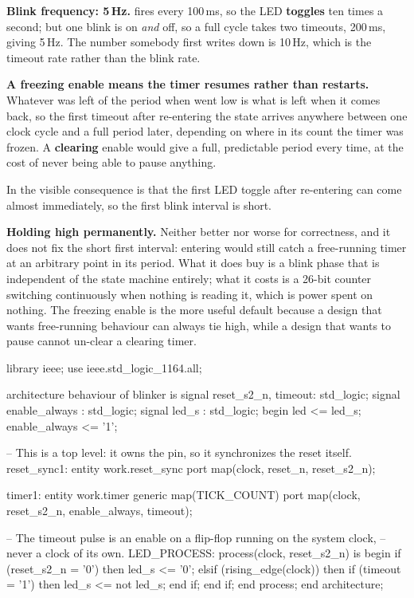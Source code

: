 \textbf{Blink frequency: 5\,Hz.}  fires every 100\,ms, so the LED \textbf{toggles} ten
times a second; but one blink is on \emph{and} off, so a full cycle takes two timeouts, 200\,ms,
giving 5\,Hz. The number somebody first writes down is 10\,Hz, which is the timeout rate rather than
the blink rate. 

\textbf{A freezing enable means the timer resumes rather than restarts.} Whatever was left of the
period when  went low is what is left when it comes back, so the first timeout after
re-entering the state arrives anywhere between one clock cycle and a full period later, depending on
where in its count the timer was frozen. A \textbf{clearing} enable would give a full, predictable
period every time, at the cost of never being able to pause anything.

In  the visible consequence is that the first LED toggle after re-entering
 can come almost immediately, so the first blink interval is short. 

\textbf{Holding  high permanently.} Neither better nor worse for correctness, and it
does not fix the short first interval: entering  would still catch a free-running
timer at an arbitrary point in its period. What it does buy is a blink phase that is independent of
the state machine entirely; what it costs is a 26-bit counter switching continuously when nothing
is reading it, which is power spent on nothing. The freezing enable is the more useful default
because a design that wants free-running behaviour can always tie  high, while a design
that wants to pause cannot un-clear a clearing timer. 

\begin{vhdlcode}
library ieee;
use ieee.std_logic_1164.all;

architecture behaviour of blinker is
signal reset_s2_n, timeout: std_logic;
signal enable_always      : std_logic;
signal led_s              : std_logic;
begin
    led           <= led_s;
    enable_always <= '1';

    -- This is a top level: it owns the pin, so it synchronizes the reset itself.
    reset_sync1: entity work.reset_sync
        port map(clock, reset_n, reset_s2_n);

    timer1: entity work.timer
        generic map(TICK_COUNT)
        port map(clock, reset_s2_n, enable_always, timeout);

    -- The timeout pulse is an enable on a flip-flop running on the system clock,
    -- never a clock of its own.
    LED_PROCESS: process(clock, reset_s2_n) is
    begin
        if (reset_s2_n = '0') then
            led_s <= '0';
        elsif (rising_edge(clock)) then
            if (timeout = '1') then
                led_s <= not led_s;
            end if;
        end if;
    end process;
end architecture;
\end{vhdlcode}

